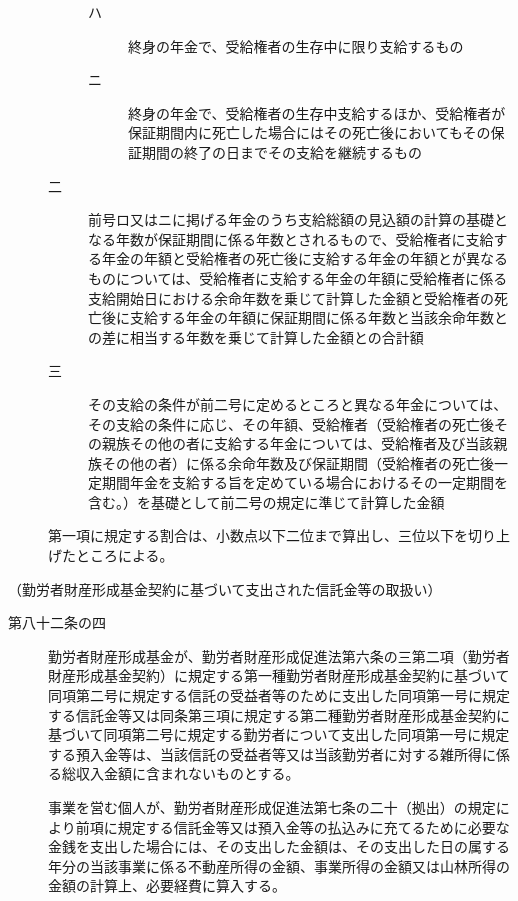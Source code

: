 \documentclass[twocolumn,a4j,10pt]{ltjtarticle}
\begin{document}
\begin{description}
\begin{description}
\begin{description}
\item[ハ]終身の年金で、受給権者の生存中に限り支給するもの
\item[ニ]終身の年金で、受給権者の生存中支給するほか、受給権者が保証期間内に死亡した場合にはその死亡後においてもその保証期間の終了の日までその支給を継続するもの
\end{description}
\item[二]前号ロ又はニに掲げる年金のうち支給総額の見込額の計算の基礎となる年数が保証期間に係る年数とされるもので、受給権者に支給する年金の年額と受給権者の死亡後に支給する年金の年額とが異なるものについては、受給権者に支給する年金の年額に受給権者に係る支給開始日における余命年数を乗じて計算した金額と受給権者の死亡後に支給する年金の年額に保証期間に係る年数と当該余命年数との差に相当する年数を乗じて計算した金額との合計額
\item[三]その支給の条件が前二号に定めるところと異なる年金については、その支給の条件に応じ、その年額、受給権者（受給権者の死亡後その親族その他の者に支給する年金については、受給権者及び当該親族その他の者）に係る余命年数及び保証期間（受給権者の死亡後一定期間年金を支給する旨を定めている場合におけるその一定期間を含む。）を基礎として前二号の規定に準じて計算した金額
\end{description}
\item[\rensuji{3}]第一項に規定する割合は、小数点以下二位まで算出し、三位以下を切り上げたところによる。
\end{description}
\noindent\hspace{10pt}（勤労者財産形成基金契約に基づいて支出された信託金等の取扱い）
\begin{description}
\item[第八十二条の四]勤労者財産形成基金が、勤労者財産形成促進法第六条の三第二項（勤労者財産形成基金契約）に規定する第一種勤労者財産形成基金契約に基づいて同項第二号に規定する信託の受益者等のために支出した同項第一号に規定する信託金等又は同条第三項に規定する第二種勤労者財産形成基金契約に基づいて同項第二号に規定する勤労者について支出した同項第一号に規定する預入金等は、当該信託の受益者等又は当該勤労者に対する雑所得に係る総収入金額に含まれないものとする。
\item[]事業を営む個人が、勤労者財産形成促進法第七条の二十（拠出）の規定により前項に規定する信託金等又は預入金等の払込みに充てるために必要な金銭を支出した場合には、その支出した金額は、その支出した日の属する年分の当該事業に係る不動産所得の金額、事業所得の金額又は山林所得の金額の計算上、必要経費に算入する。
\end{description}
\end{document}
